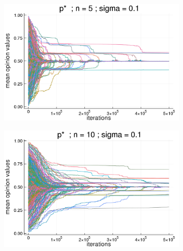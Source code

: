 \documentclass{article}
\begin{document}
    \begin{figure}[H]
      \centering
      \begin{subfigure}[b]{0.45\textwidth}
        \includegraphics[width=\textwidth]{img/compare-ps/Poodlcalculatep*n5-rho10e-5-sigma01-00intrans.png}
      \end{subfigure}
      \begin{subfigure}[b]{0.45\textwidth}
        \includegraphics[width=\textwidth]{img/compare-ps/Poodlcalculatep*n10-rho10e-5-sigma01-00intrans.png}
      \end{subfigure}
      \begin{subfigure}[b]{0.45\textwidth}

\end{subfigure}
\end{figure}
\end{document}
